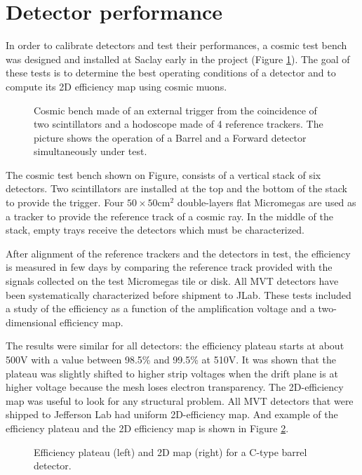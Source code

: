 \section{Detector performance}

In order to calibrate detectors and test their performances, a cosmic test bench was designed and installed at Saclay 
early in the project (Figure \ref{fig:mm-testbench}). The goal of these tests is to determine the best operating 
conditions of a detector and to compute its 2D efficiency map using cosmic muons.


\begin{figure}[htb]
 \caption{Cosmic bench made of an external trigger from the coincidence of two scintillators and a hodoscope made of 4 
reference trackers. The picture shows the operation of a Barrel and a Forward detector simultaneously under test.}
 \label{fig:mm-testbench}
\end{figure}

The cosmic test bench shown on Figure, consists of a vertical stack of six detectors. Two scintillators are installed 
at the top and the bottom of the stack to provide the trigger. Four $50 \times 50 \text{cm}^2$ double-layers flat 
Micromegas are used as a tracker to provide the reference track of a cosmic ray. In the middle of the stack, empty 
trays receive the detectors which must be characterized.

After alignment of the reference trackers and the detectors in test, the efficiency is measured in few days by 
comparing the reference track provided with the signals collected on the test Micromegas tile or disk. All MVT detectors 
have been systematically characterized before shipment to JLab. These tests included a study of the efficiency as a 
function of the amplification voltage and a two-dimensional efficiency map.

The results were similar for all detectors: the efficiency plateau starts at about 500V with a value between 98.5\% and 
99.5\% at 510V. It was shown that the plateau was slightly shifted to higher strip voltages when the drift plane is at 
higher voltage because the mesh loses electron transparency. The 2D-efficiency map was useful to look for any 
structural problem. All MVT detectors that were shipped to Jefferson Lab had uniform 2D-efficiency map. And example of 
the efficiency plateau and the 2D efficiency map is shown in Figure \ref{fig:mm-fig8}.

\begin{figure}[htb]
 \caption{Efficiency plateau (left) and 2D map (right) for a C-type barrel detector.}
 \label{fig:mm-fig8}
\end{figure}

